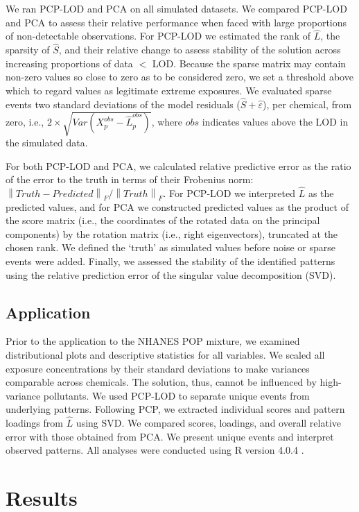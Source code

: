 We ran PCP-LOD and PCA on all simulated datasets. We compared PCP-LOD and PCA to assess their relative performance when faced with large proportions of non-detectable observations. For PCP-LOD we estimated the rank of $\hat{L}$, the sparsity of $\hat{S}$, and their relative change to assess stability of the solution across increasing proportions of data $<$ LOD. Because the sparse matrix may contain non-zero values so close to zero as to be considered zero, we set a threshold above which to regard values as legitimate extreme exposures. We evaluated sparse events two standard deviations of the model residuals ($\hat{S} + \hat{\varepsilon}$), per chemical, from zero, i.e., $2 \times \sqrt{Var(X_{p}^{obs} - \hat{L}_{p}^{obs})}$, where $obs$ indicates values above the LOD in the simulated data.

For both PCP-LOD and PCA, we calculated relative predictive error as the ratio of the error to the truth in terms of their Frobenius norm: $\left\lVert Truth - Predicted\right\rVert_F / \left\lVert  Truth\right\rVert_F$. For PCP-LOD we interpreted $\hat{L}$ as the predicted values, and for PCA we constructed predicted values as the product of the score matrix (i.e., the coordinates of the rotated data on the principal components) by the rotation matrix (i.e., right eigenvectors), truncated at the chosen rank. We defined the `truth' as simulated values before noise or sparse events were added. Finally, we assessed the stability of the identified patterns using the relative prediction error of the singular value decomposition (SVD).

\subsection{Application}
Prior to the application to the NHANES POP mixture, we examined distributional plots and descriptive statistics for all variables. We scaled all exposure concentrations by their standard deviations to make variances comparable across chemicals. The solution, thus, cannot be influenced by high-variance pollutants. We used PCP-LOD to separate unique events from underlying patterns. Following PCP, we extracted individual scores and pattern loadings from $\hat{L}$ using SVD. We compared scores, loadings, and overall relative error with those obtained from PCA. We present unique events and interpret observed patterns. All analyses were conducted using R version 4.0.4 \citep{rrr}.

\section{Results}

